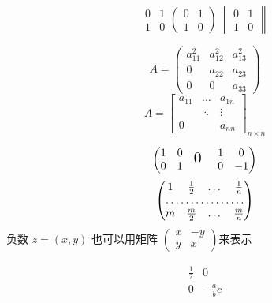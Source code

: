 \documentclass{ctexart}
\begin{document}
    \[
    \begin{matrix}
        0 & 1 \\
        1 & 0
    \end{matrix} 
    \begin{pmatrix}
        0 & 1 \\
        1 & 0   
    \end{pmatrix}
    \begin{Vmatrix}
        0 & 1 \\
        1 & 0
    \end{Vmatrix}
    \]

    \[
      A = \begin{pmatrix}
          a_{11}^2 & a_{12}^2 & a_{13}^2 \\
          0 & a_{22} & a_{23} \\
          0 & 0 & a_{33}
      \end{pmatrix}  
    \]
    \[
      A = \begin{bmatrix}
          a_{11} & \dots & a_{1n} \\
          & \ddots & \vdots \\
          0 & & a_{nn}
      \end{bmatrix}_{n \times n}  
    \]

    
    \[
      \begin{pmatrix}
          \begin{matrix}
              1 & 0 \\ 0 & 1
          \end{matrix}
          & \text{\Large 0 } & \begin{matrix}
              1& 0 \\ 0 & -1 
          \end{matrix}
      \end{pmatrix} 
    \]
    \[
      \begin{pmatrix}
          1& \frac 12 & \dots & \frac 1n \\
          \hdotsfor{4} \\
          m & \frac m2 & \dots & \frac mn 
      \end{pmatrix}
    \]
    负数 $z= (x,y) $ 也可以用矩阵
    \begin{math}
        \left( %
            \begin{smallmatrix}
                x & -y \\ y & x 
            \end{smallmatrix}
        \right) %
    \end{math}来表示


    \[
      \begin{array}{r|r}
          \frac12 & 0 \\
          \hline
          0 & -\frac abc
      \end{array}  
    \]
\end{document}
